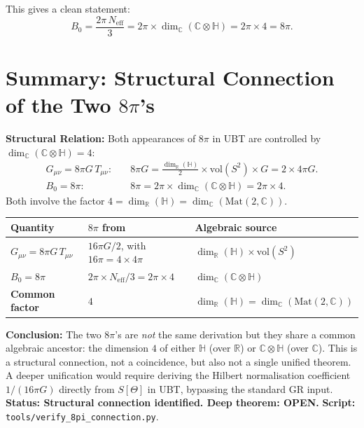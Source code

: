 \documentclass[12pt,a4paper]{article}
\theoremstyle{definition}
\theoremstyle{remark}
\begin{document}
This gives a clean statement:
\[
  B_0 = \frac{2\pi\,N_{\mathrm{eff}}}{3}
      = 2\pi\times\dim_{\mathbb{C}}(\mathbb{C}\otimes\mathbb{H})
      = 2\pi\times 4 = 8\pi.
\]

\section{Summary: Structural Connection of the Two $8\pi$'s}
\label{sec:summary}

\begin{insightbox}
\textbf{Structural Relation:}
Both appearances of $8\pi$ in UBT are controlled by
$\dim_{\mathbb{C}}(\mathbb{C}\otimes\mathbb{H}) = 4$:
\begin{align}
  G_{\mu\nu} = 8\pi G\,T_{\mu\nu}: &\quad
    8\pi G = \frac{\dim_{\mathbb{R}}(\mathbb{H})}{2}\times\mathrm{vol}(S^2)\times G
    = 2 \times 4\pi G. \\
  B_0 = 8\pi: &\quad
    8\pi = 2\pi\times\dim_{\mathbb{C}}(\mathbb{C}\otimes\mathbb{H})
    = 2\pi\times 4.
\end{align}
Both involve the factor $4 = \dim_{\mathbb{R}}(\mathbb{H}) = \dim_{\mathbb{C}}(\mathrm{Mat}(2,\mathbb{C}))$.
\end{insightbox}

\begin{center}
\begin{tabular}{lll}
  \toprule
  \textbf{Quantity} & \textbf{$8\pi$ from} & \textbf{Algebraic source} \\
  \midrule
  $G_{\mu\nu} = 8\pi G\,T_{\mu\nu}$
    & $16\pi G / 2$, with $16\pi = 4\times 4\pi$
    & $\dim_{\mathbb{R}}(\mathbb{H})\times\mathrm{vol}(S^2)$ \\
  $B_0 = 8\pi$
    & $2\pi\times N_{\mathrm{eff}}/3 = 2\pi\times 4$
    & $\dim_{\mathbb{C}}(\mathbb{C}\otimes\mathbb{H})$ \\
  \midrule
  \textbf{Common factor}
    & $4$
    & $\dim_{\mathbb{R}}(\mathbb{H}) = \dim_{\mathbb{C}}(\mathrm{Mat}(2,\mathbb{C}))$ \\
  \bottomrule
\end{tabular}
\end{center}

\begin{resultbox}
\textbf{Conclusion:}
The two $8\pi$'s are \emph{not} the same derivation but they share a
common algebraic ancestor: the dimension $4$ of either $\mathbb{H}$
(over $\mathbb{R}$) or $\mathbb{C}\otimes\mathbb{H}$ (over $\mathbb{C}$).
This is a structural connection, not a coincidence, but also not a
single unified theorem.  A deeper unification would require deriving
the Hilbert normalisation coefficient $1/(16\pi G)$ directly from
$S[\Theta]$ in UBT, bypassing the standard GR input.
\textbf{Status: Structural connection identified. Deep theorem: OPEN.}
\textbf{Script:} \texttt{tools/verify\_8pi\_connection.py}.
\end{resultbox}
\end{document}

